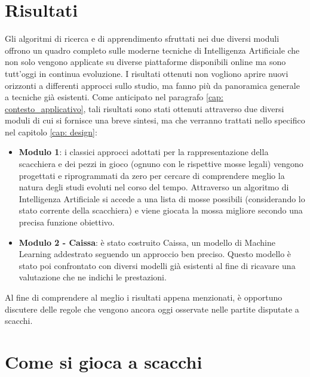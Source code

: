 \section{Risultati}
Gli algoritmi di ricerca e di apprendimento sfruttati nei due diversi moduli offrono un quadro completo sulle moderne tecniche di Intelligenza
Artificiale che non solo vengono applicate su diverse piattaforme disponibili online ma sono tutt'oggi in continua evoluzione. 
I risultati ottenuti non vogliono aprire nuovi orizzonti a differenti approcci sullo studio, 
ma fanno più da panoramica generale a tecniche già esistenti. Come anticipato nel paragrafo \ref{cap: contesto_applicativo}, tali risultati sono stati ottenuti attraverso due diversi moduli di cui si fornisce una breve sintesi, ma che verranno trattati nello specifico nel capitolo \ref{cap: design}:
\begin{itemize}
    \item \textbf{Modulo 1}: i classici approcci adottati per la rappresentazione della scacchiera e dei pezzi in gioco (ognuno con le rispettive mosse legali) vengono progettati e riprogrammati da zero per cercare di comprendere meglio la natura degli studi evoluti nel corso del tempo. Attraverso un algoritmo di Intelligenza Artificiale si accede a una lista di mosse possibili (considerando lo stato corrente della scacchiera) e viene giocata la mossa migliore secondo una precisa funzione obiettivo.
    \item \textbf{Modulo 2 - Caissa}: è stato costruito Caissa, un modello di Machine Learning addestrato seguendo un approccio ben preciso. Questo modello è stato poi confrontato con diversi modelli già esistenti al fine di ricavare una valutazione che ne indichi le prestazioni. 
\end{itemize}
Al fine di comprendere al meglio i risultati appena menzionati, è opportuno discutere delle regole che vengono ancora oggi osservate nelle partite disputate a scacchi.

\section{Come si gioca a scacchi}
